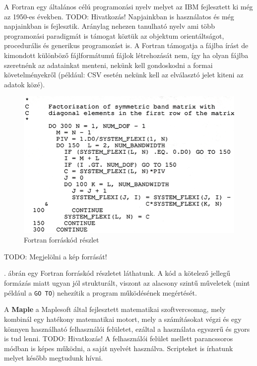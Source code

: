 
A Fortran egy általános célú programozási nyelv melyet az IBM
fejlesztett ki még az 1950-es években.
TODO: Hivatkozás! %
Napjainkban is használatos és még
napjainkban is fejlesztik. Aránylag nehezen tanulható nyelv ami több
programozási paradigmát is támogat köztük az objektum orientáltságot,
procedurális és generikus programozást is. A Fortran támogatja a fájlba
írást de kimondott különböző fájlformátumú fájlok létrehozását nem, így
ha olyan fájlba szeretnénk az adatainkat menteni, nekünk kell
gondoskodni a formai követelményekről (például: CSV esetén nekünk kell
az elválasztó jelet kiteni az adatok közé).

\begin{figure}[h!]
\centering
\includegraphics{img/FORTRAN_code_example.png}
\caption{Fortran forráskód részlet}
\label{fig:fortran}
\end{figure}
TODO: Megjelölni a kép forrását!

. ábrán egy Fortran forráskód részletet láthatunk. A kód a kötelező jellegű formázás miatt ugyan jól strukturált, viszont az alacsony szintű műveletek (mint például a \texttt{GO TO}) nehezítik a program működésének megértését.

\label{maple}

A \textbf{Maple} a Maplesoft által fejlesztett matematikai
szoftvercsomag, mely kombinál egy hatékony matematikai motort, mely a
számításokat végzi és egy könnyen használható felhasználói felületet,
ezáltal a használata egyszerű és gyors is tud lenni. 
TODO: Hivatkozás! %
A felhasználói
felület mellett parancssoros módban is képes működni, a saját nyelvét
használva. Scripteket is írhatunk melyet később megtudunk hívni.

